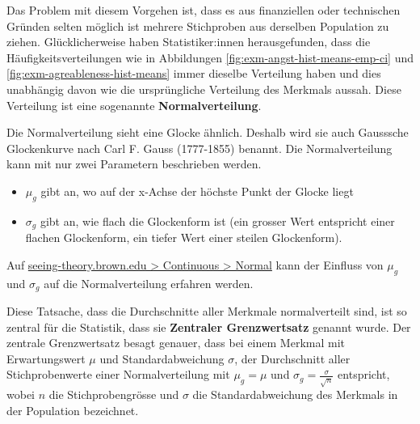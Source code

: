 \documentclass[
]{book}
\providecommand{\tightlist}{%
  \setlength{\itemsep}{0pt}\setlength{\parskip}{0pt}}
\theoremstyle{definition}
\theoremstyle{definition}
\theoremstyle{definition}
\theoremstyle{definition}
\theoremstyle{remark}
\begin{document}
Das Problem mit diesem Vorgehen ist, dass es aus finanziellen oder technischen Gründen selten möglich ist mehrere Stichproben aus derselben Population zu ziehen. Glücklicherweise haben Statistiker:innen herausgefunden, dass die Häufigkeitsverteilungen wie in Abbildungen \ref{fig:exm-angst-hist-means-emp-ci} und \ref{fig:exm-agreableness-hist-means} immer dieselbe Verteilung haben und dies unabhängig davon wie die ursprüngliche Verteilung des Merkmals aussah. \label{customdef-normalverteilung}{Diese Verteilung ist eine sogenannte \textbf{Normalverteilung}}.

Die Normalverteilung sieht eine Glocke ähnlich. Deshalb wird sie auch Gausssche Glockenkurve nach Carl F. Gauss (1777-1855) benannt. Die Normalverteilung kann mit nur zwei Parametern beschrieben werden.

\begin{itemize}
\tightlist
\item
  \(\mu_g\) gibt an, wo auf der x-Achse der höchste Punkt der Glocke liegt
\item
  \(\sigma_g\) gibt an, wie flach die Glockenform ist (ein grosser Wert entspricht einer flachen Glockenform, ein tiefer Wert einer steilen Glockenform).
\end{itemize}

Auf \href{https://seeing-theory.brown.edu/probability-distributions/index.html\#section2}{seeing-theory.brown.edu \textgreater{} Continuous \textgreater{} Normal} kann der Einfluss von \(\mu_g\) und \(\sigma_g\) auf die Normalverteilung erfahren werden.

\label{customdef-zentraler-grenzwertsatz}{Diese Tatsache, dass die Durchschnitte aller Merkmale normalverteilt sind, ist so zentral für die Statistik, dass sie \textbf{Zentraler Grenzwertsatz} genannt wurde.} Der zentrale Grenzwertsatz besagt genauer, dass bei einem Merkmal mit Erwartungswert \(\mu\) und Standardabweichung \(\sigma\), der Durchschnitt aller Stichprobenwerte einer Normalverteilung mit \(\mu_g = \mu\) und \(\sigma_g = \frac{\sigma}{\sqrt{n}}\) entspricht, wobei \(n\) die Stichprobengrösse und \(\sigma\) die Standardabweichung des Merkmals in der Population bezeichnet.
\end{document}
